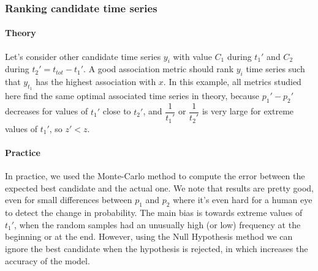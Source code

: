 \documentclass[12pt,a4paper]{article}
\begin{document}




\subsubsection*{Ranking candidate time series}

\paragraph{Theory}
Let's consider other candidate time series $y_i$ with value $C_1$ during $t_1'$ and $C_2$ during $t_2'=t_{tot}-t_1'$. 
A good association metric should rank $y_i$ time series such that $y_{t_1}$ has the highest association with $x$. 
In this example, all metrics studied here find the same optimal associated time series in theory, because $p_1'-p_2'$ decreases for values of $t_1'$ close to $t_2'$, and $\dfrac{1}{t_1'}$ or $\dfrac{1}{t_2'}$ is very large for extreme values of $t_1'$, so $z' < z$.

\paragraph{Practice}
In practice, we used the Monte-Carlo method to compute the error between the expected best candidate and the actual one. We note that results are pretty good, even for small differences between $p_1$ and $p_2$ where it's even hard for a human eye to detect the change in probability. The main bias is towards extreme values of $t_1'$, when the random samples had an unusually high (or low) frequency at the beginning or at the end. However, using the Null Hypothesis method we can ignore the best candidate when the hypothesis is rejected, in which increases the accuracy of the model.
\end{document}
